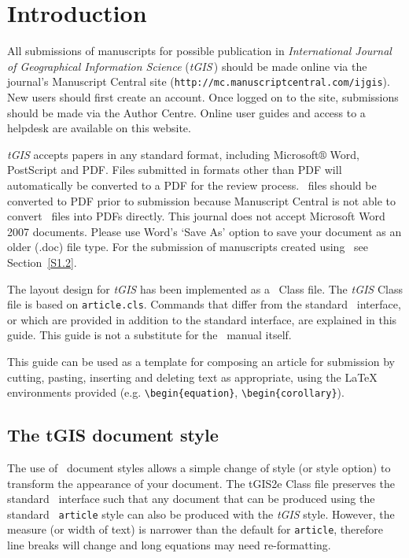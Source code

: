\documentclass[]{tGIS2e}
\begin{document}

\section{Introduction}

All submissions of manuscripts for possible publication in {\itshape International Journal of Geographical Information Science} ({\it tGIS}\,)  should be made online via the journal's Manuscript Central site ({\tt{http://mc.manuscriptcentral.com/ijgis}}). New users should first create an account. Once logged on to the site, submissions should be made via the Author Centre. Online user guides and access to a helpdesk are available on this website.

{\it tGIS} accepts papers in any standard format, including Microsoft$\circledR$ Word, PostScript and PDF. Files submitted in formats other than PDF will automatically be converted to a PDF for the review process. \LaTeXe\ files should be converted to PDF prior to submission because Manuscript Central is not able to convert \LaTeXe\ files into PDFs directly. This journal does not accept Microsoft Word 2007 documents. Please use Word's `Save As' option to save your document as an older (.doc) file type. For the submission of manuscripts created using \LaTeXe\, see Section~\ref{S1.2}.

The layout design for {\it tGIS} has been implemented as a \LaTeXe\ Class file. The {\it tGIS} Class file is
based on {\tt article.cls}. Commands that differ from the standard \LaTeXe\ interface, or which are provided in
addition to the standard interface, are explained in this guide. This guide is not a substitute for the \LaTeXe\
manual itself.

This guide can be used as a template for composing an article for submission by cutting, pasting, inserting and
deleting text as appropriate, using the LaTeX environments provided (e.g. \verb"\begin{equation}",
\verb"\begin{corollary}").\vspace{6pt}

\subsection{The {\bi tGIS} document style}

The use of \LaTeXe\ document styles allows a simple change of style (or style option) to transform the appearance
of your document. The tGIS2e Class file preserves the standard \LaTeXe\ interface such that any document that can
be produced using the standard \LaTeXe\ {\tt article} style can also be produced with the {\it tGIS} style.
However, the measure (or width of text) is narrower than the default for {\tt article}, therefore line breaks
will change and long equations may need re-formatting.
\end{document}
